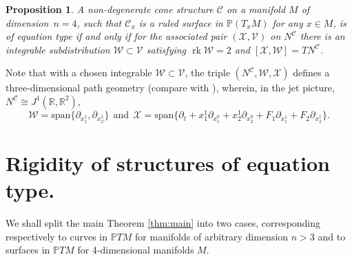 \documentclass[11pt]{amsart}
\newtheorem{proposition}[theorem]{Proposition}
\theoremstyle{definition}
\newcommand{\PP}{\mathbb{P}}
\newcommand{\rk}{\operatorname{rk}}
\newcommand{\spn}{\mathrm{span}}
\newcommand{\VV}{\mathcal{V}}
\newcommand{\WW}{\mathcal{W}}
\newcommand{\XX}{\mathcal{X}}
\newcommand{\CC}{\mathcal{C}}
\begin{document}
\begin{proposition}\label{prop2}
A non-degenerate cone structure $\CC$ on a manifold $M$ of dimension~$n=4$, such that $\CC_x$ is a ruled surface in $\PP(T_xM)$ for any $x\in M$, is of equation type if and only if for the associated pair $(\XX,\VV)$ on $N^\CC$ there is an integrable subdistribution $\WW\subset \VV$ satisfying $\rk\WW=2$ and $[\XX,\WW]=TN^\CC$.
\end{proposition}
Note that with a chosen integrable $\WW\subset \VV$, the triple $(N^\CC,\WW,\XX)$ defines a three-dimensional path geometry (compare with \cite{G}), wherein, in the jet picture, $N^\mathcal{C}\cong J^1(\mathbb{R},\mathbb{R}^2)$,
\[
\WW=\spn\{\partial_{x^1_1},\partial_{x^1_2}\}\ \  \mathrm{and}
\ \  \XX=\spn\{\partial_t+x^1_1\partial_{x^0_1}+x^1_2\partial_{x^0_2}+F_1\partial_{x_1^1}+F_2\partial_{x_2^1}\}.
\]


\section{Rigidity of structures of equation type.}
We shall split the main Theorem \ref{thm:main} into two cases, corresponding respectively to curves in $\PP TM$ for manifolds of arbitrary dimension $n>3$ and to surfaces in $\PP TM$ for 4-dimensional manifolds $M$.
\end{document}
